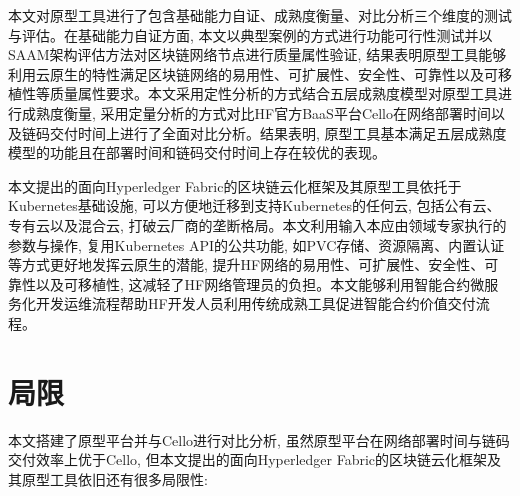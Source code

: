 本文对原型工具进行了包含基础能力自证、成熟度衡量、对比分析三个维度的测试与评估。在基础能力自证方面, 本文以典型案例的方式进行功能可行性测试并以SAAM架构评估方法对区块链网络节点进行质量属性验证, 结果表明原型工具能够利用云原生的特性满足区块链网络的易用性、可扩展性、安全性、可靠性以及可移植性等质量属性要求。本文采用定性分析的方式结合五层成熟度模型对原型工具进行成熟度衡量, 采用定量分析的方式对比HF官方BaaS平台Cello在网络部署时间以及链码交付时间上进行了全面对比分析。结果表明, 原型工具基本满足五层成熟度模型的功能且在部署时间和链码交付时间上存在较优的表现。

本文提出的面向Hyperledger Fabric的区块链云化框架及其原型工具依托于Kubernetes基础设施, 可以方便地迁移到支持Kubernetes的任何云, 包括公有云、专有云以及混合云, 打破云厂商的垄断格局。本文利用输入本应由领域专家执行的参数与操作, 复用Kubernetes API的公共功能, 如PVC存储、资源隔离、内置认证等方式更好地发挥云原生的潜能, 提升HF网络的易用性、可扩展性、安全性、可靠性以及可移植性, 这减轻了HF网络管理员的负担。本文能够利用智能合约微服务化开发运维流程帮助HF开发人员利用传统成熟工具促进智能合约价值交付流程。

\section{局限}

本文搭建了原型平台并与Cello进行对比分析, 虽然原型平台在网络部署时间与链码交付效率上优于Cello, 但本文提出的面向Hyperledger Fabric的区块链云化框架及其原型工具依旧还有很多局限性:

